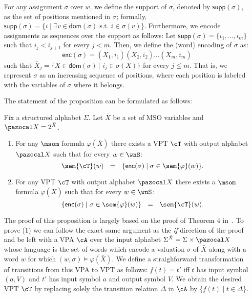 For any assignment $\sigma$ over $w$, we define the support of $\sigma$, denoted by $\textsf{supp}(\sigma)$, as the set of positions mentioned in $\sigma$; formally, $\textsf{supp}(\sigma) = \{i \mid \exists v \in  \textsf{dom}(\sigma)\text{ s.t. } i \in  \sigma(v)\}$. 
Furthermore, we encode assignments as sequences over the support as follows:
Let $\textsf{supp}(\sigma) = \{i_1,\ldots, i_m\}$ such that $i_j < i_{j+1}$ for every $j < m$. 
Then, we define the (word) encoding of $\sigma$ as:
$$
\textsf{enc}(\sigma) = (\bar{X}_1, i_1)(\bar{X}_2, i_2) \ldots (\bar{X}_m, i_m)
$$
such that $\bar{X}_j = \{X \in \textsf{dom}(\sigma) \mid i_j \in \sigma(X)\}$ for every $j \leq m$. 
That is, we represent $\sigma$ as an increasing sequence of positions, where each position is labeled with the variables of $\sigma$ where it belongs.

The statement of the proposition can be formulated as follows:
\begin{proposition}
	Fix a structured alphabet $\Sigma$. Let $\bar{X}$ be a set of MSO variables and ${\pazocal X} = 2^{\bar{X}}$. 
	\begin{enumerate}
		\item For any $\msom$ formula $\varphi(\bar{X})$ there exists a VPT $\cT$ with output alphabet ${\pazocal X}$ such that for every $w\in \wnS$:
		$$
		\sem{\cT}(w) \ \ = \ \ \{\textsf{enc}(\sigma)\mid \sigma\in\sem{\varphi}(w)\}.
		$$
		\item For any VPT $\cT$ with output alphabet ${\pazocal X}$ there exists a  $\msom$ formula $\varphi(\bar{X})$ such that for every $w\in \wnS$:
		$$
		\{\textsf{enc}(\sigma)\mid \sigma\in\sem{\varphi}(w)\} \ \ = \ \  \sem{\cT}(w).
		$$
	\end{enumerate}
\end{proposition}

The proof of this proposition is largely based on the proof of Theorem 4 in~\cite{AlurM04}.
To prove (1) we can follow the exact same argument as the {\em if} direction of the proof and be left with a VPA $\cA$ over the input alphabet $\Sigma^{\bar{X}} = \Sigma \times {\pazocal X}$ whose language is the set of words which encode a valuation $\sigma$ of $\bar{X}$ along with a word $w$ for which $(w, \sigma)\models\varphi(\bar{X})$. 
We define a straighforward transformation of transitions from this VPA to VPT as follows: $f(t) = t'$ iff $t$ has input symbol $(a, V)$ and $t'$ has input symbol $a$ and output symbol $V$.
We obtain the desired VPT $\cT$ by replacing solely the transition relation $\Delta$ in $\cA$ by $\{f(t)\mid t\in\Delta\}$.

